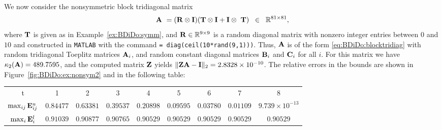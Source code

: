 \newpage

\begin{example}\label{ex:BDiDo:nonsym2}{\textrm
We now consider the  nonsymmetric block tridiagonal matrix
\[\mathbf{A}~=(\mathbf{R}\otimes \mathbf{I})(\mathbf{T}\otimes \mathbf{I}+ \mathbf{I}\otimes~\mathbf{T}) \;\;\in\;\;\mathbb{R}^{81\times 81},\]
where $\mathbf{T}$ is given as in \textnormal{Example~\ref{ex:BDiDo:symm}}, and
$\mathbf{R}\in\mathbb{R}^{9\times 9}$ is a random diagonal matrix with nonzero integer
entries between $0$ and $10$ and constructed in \textnormal{\texttt{MATLAB}}
with the command \textnormal{\texttt{\R = diag(ceil(10*rand(9,1)))}}. Thus,
$\mathbf{A}$ is of the form \eqref{eq:BDiDo:blocktridiag} with random tridiagonal
Toeplitz matrices $\mathbf{A}_i$, and random constant diagonal matrices $\mathbf{B}_i$ and
$\mathbf{C}_i$ for all $i$. For this matrix we have $\kappa_2(\mathbf{A})=489.7595$, and the
computed matrix $\mathbf{Z}$ yields $\|\mathbf{Z}\mathbf{A}-\mathbf{I}\|_2=2.8328\times 10^{-10}$. The relative
errors in the bounds are shown in \textnormal{Figure~\ref{fig:BDiDo:ex:nonsym2}} and in the following table:
%
\begin{table}[h!]\scriptsize\centering
\begin{tabular}{c c c c c c c c c}
\hline
 t & 1 & 2 & 3 & 4 & 5 & 6 & 7 & 8 \\
 $\max_{ij}\mathbf{E}^{u}_{ij}$ &  $0.84477$ & $0.63381$  &  $0.39537$ &  $0.20898$ & $0.09595$ &  $0.03780$ &  $0.01109$ &  $9.739\times 10^{-13}$\\
 $\max_{i}\mathbf{E}^{l}_{i}$ &  $0.91039$ & $0.90877$ & $0.90765$ & $0.90529$ & $0.90529$ &  $0.90529$ &  $0.90529$ &  $0.90529$\\
  \hline
\end{tabular}
\end{table}
%

}
\end{example}
